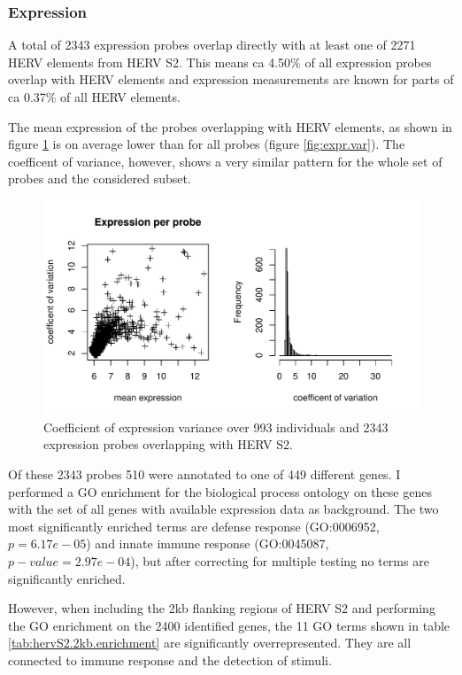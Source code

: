 \documentclass[a4paper,12pt]{article}
\begin{document}
\subsubsection{Expression}
A total of 2343 expression probes overlap directly with at least one of 2271 HERV elements from HERV S2. This means ca 4.50\% of all expression probes overlap with HERV elements and expression measurements are known for parts of ca 0.37\% of all HERV elements.

The mean expression of the probes overlapping with HERV elements, as shown in figure \ref{fig:hervS2.expr.var} is on average lower than for all probes (figure \ref{fig:expr.var}). The coefficent of variance, however, shows a very similar pattern for the whole set of probes and the considered subset.

\begin{figure}[tb]
	\includegraphics[scale = 1, keepaspectratio = true]{../figures/hervS2_expr_var}  
	\caption{Coefficient of expression variance over 993 individuals and 2343 expression probes overlapping with HERV S2.}
    \label{fig:hervS2.expr.var}
\end{figure}

Of these 2343 probes 510 were annotated to one of 449 different genes. I performed a GO enrichment for the biological process ontology on these genes with the set of all genes with available expression data as background. The two most significantly enriched terms are defense response (GO:0006952, $p=6.17e-05$) and innate immune response (GO:0045087, $p-value=	
2.97e-04$), but after correcting for multiple testing no terms are significantly enriched.

However, when including the 2kb flanking regions of HERV S2 and performing the GO enrichment on the 2400 identified genes, the 11 GO terms shown in table \ref{tab:hervS2.2kb.enrichment} are significantly overrepresented. They are all connected to immune response and the detection of stimuli.
\end{document}
